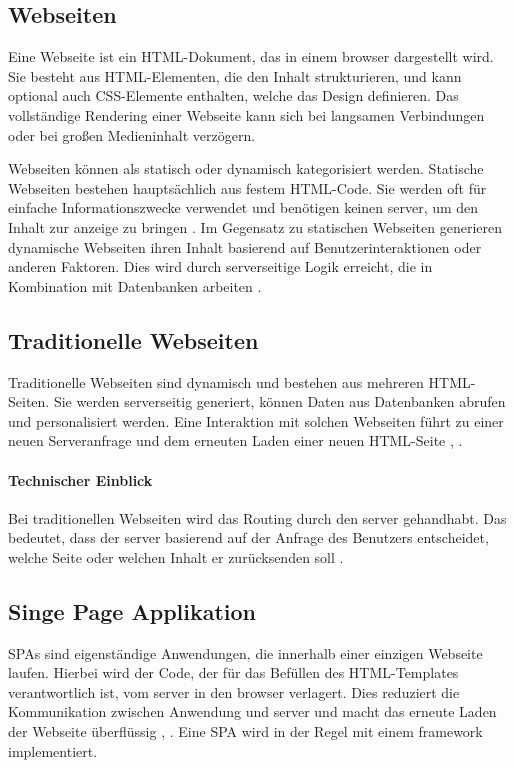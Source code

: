 \subsection{Webseiten}
Eine Webseite ist ein \ac{HTML}-Dokument, das in einem \gls{browser} dargestellt wird.
Sie besteht aus \ac{HTML}-Elementen, die den Inhalt strukturieren, und kann optional auch \ac{CSS}-Elemente enthalten, welche das Design definieren.
Das vollständige Rendering einer Webseite kann sich bei langsamen Verbindungen oder bei großen Medieninhalt verzögern.

Webseiten können als statisch oder dynamisch kategorisiert werden.
Statische Webseiten bestehen hauptsächlich aus festem HTML-Code.
Sie werden oft für einfache Informationszwecke verwendet und benötigen keinen \gls{server}, um den Inhalt zur anzeige zu bringen \cite{Robbins2018}.
Im Gegensatz zu statischen Webseiten generieren dynamische Webseiten ihren Inhalt basierend auf Benutzerinteraktionen oder anderen Faktoren.
Dies wird durch serverseitige Logik erreicht, die in Kombination mit Datenbanken arbeiten \cite{Robbins2018}.

\subsection{Traditionelle Webseiten}
Traditionelle Webseiten sind dynamisch und bestehen aus mehreren \ac{HTML}-Seiten.
Sie werden serverseitig generiert, können Daten aus Datenbanken abrufen und personalisiert werden.
Eine Interaktion mit solchen Webseiten führt zu einer neuen Serveranfrage und dem erneuten Laden einer neuen \ac{HTML}-Seite \cite{Robbins2018}, \cite{Scott2015}.

\paragraph*{Technischer Einblick}
Bei traditionellen Webseiten wird das Routing durch den \gls{server} gehandhabt.
Das bedeutet, dass der \gls{server} basierend auf der Anfrage des Benutzers entscheidet, welche Seite oder welchen Inhalt er zurücksenden soll \cite{Robbins2018}.

\subsection{Singe Page Applikation}
\ac{SPA}s sind eigenständige Anwendungen, die innerhalb einer einzigen Webseite laufen.
Hierbei wird der Code, der für das Befüllen des \ac{HTML}-Templates verantwortlich ist, vom \gls{server} in den \gls{browser} verlagert.
Dies reduziert die Kommunikation zwischen Anwendung und \gls{server} und macht das erneute Laden der Webseite überflüssig \cite{Flanagan2011}, \cite{Doguhan2020}.
Eine \ac{SPA} wird in der Regel mit einem \gls{framework} implementiert.

